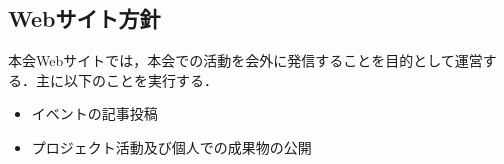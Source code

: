 \subsection*{Webサイト方針}


本会Webサイトでは，本会での活動を会外に発信することを目的として運営する．主に以下のことを実行する．
\begin{itemize}
\item イベントの記事投稿
\item プロジェクト活動及び個人での成果物の公開
\end{itemize}
